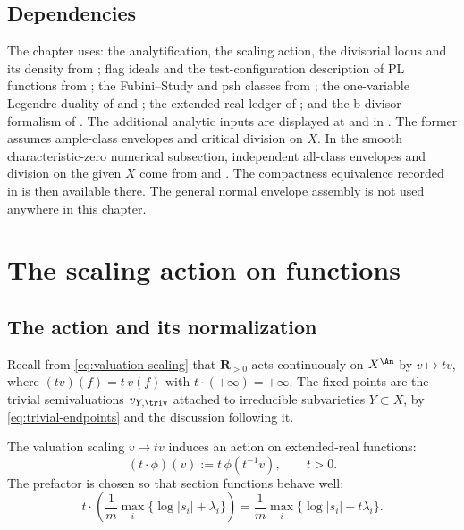 \subsection{Dependencies}
\label{sec:ch35-dependencies}

The chapter uses: the analytification, the scaling action, the divisorial
locus and its density from ; flag ideals
and the test-configuration description of PL functions from
; the Fubini--Study and psh classes from
; the one-variable Legendre duality of
 and ; the
extended-real ledger of ; and the b-divisor
formalism of . The additional analytic
inputs are displayed at  and in
. The former assumes ample-class envelopes
and critical division on $X$. In the smooth characteristic-zero
numerical subsection, independent all-class envelopes and division on
the given $X$ come from \cite[Theorem~A]{BJ22b} and
\cite[Proposition~17]{BJGreen24}. The compactness equivalence recorded
in  is then available there. The general
normal envelope assembly is not used anywhere in this chapter.

\section{The scaling action on functions}
\label{sec:ch35-scaling}

\subsection{The action and its normalization}
\label{sec:ch35-action}

Recall from \eqref{eq:valuation-scaling} that $\mathbf R_{>0}$ acts
continuously on $X^{\An}$ by $v\mapsto tv$, where
$(tv)(f)=t\,v(f)$ with $t\cdot(+\infty)=+\infty$.  The fixed points are
the trivial semivaluations $v_{Y,\triv}$ attached to irreducible
subvarieties $Y\subset X$, by \eqref{eq:trivial-endpoints} and the
discussion following it.

The valuation scaling $v\mapsto tv$ induces an action on extended-real
functions:
\begin{equation}
\label{eq:function-scaling-action}
                  (t\cdot\phi)(v):=t\,\phi(t^{-1}v),
                  \qquad t>0.
\end{equation}
The prefactor is chosen so that section functions behave well:
\begin{equation}
\label{eq:scaling-fs-weights}
 t\cdot\left(\frac1m\max_i\{\log|s_i|+\lambda_i\}\right)
   =\frac1m\max_i\{\log|s_i|+t\lambda_i\}.
\end{equation}

